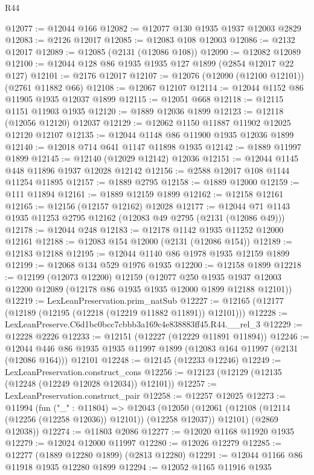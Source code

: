 \begin{lexlean}{R44}
\begin{coremodule}
@12077 := @12044 @166
@12082 := @12077 @130 @1935 @1937 @12003 @2829
@12083 := @2126 @12017
@12085 := @12083 @108 @12003
@12086 := @2132 @12017
@12089 := @12085 (@2131 (@12086 @108))
@12090 := @12082 @12089
@12100 := @12044 @128 @86 @1935 @1935 @127 @1899 (@2854 @12017 @22 @127)
@12101 := @2176 @12017
@12107 := @12076 (@12090 (@12100 @12101)) (@2761 @11882 @66)
@12108 := @12067 @12107
@12114 := @12044 @1152 @86 @11905 @1935 @12037 @1899
@12115 := @12051 @668
@12118 := @12115 @1151 @11903 @1935
@12120 := @1889 @12036 @1899
@12123 := @12118 (@12056 @12120) @12037
@12129 := @12062 @1150 @11887 @11902 @12025 @12120 @12107
@12135 := @12044 @1148 @86 @11900 @1935 @12036 @1899
@12140 := @12018 @714 @641 @1147 @11898 @1935
@12142 := @1889 @11997 @1899
@12145 := @12140 (@12029 @12142) @12036
@12151 := @12044 @1145 @448 @11896 @1937 @12028 @12142
@12156 := @2588 @12017 @108 @1144 @11254 @11895
@12157 := @1889 @2795
@12158 := @1889 @12000
@12159 := @111 @11894
@12161 := @1889 @12159 @1899
@12162 := @12158 @12161
@12165 := @12156 (@12157 @12162) @12028
@12177 := @12044 @71 @1143 @1935 @11253 @2795 @12162 (@12083 @49 @2795 (@2131 (@12086 @49)))
@12178 := @12044 @248
@12183 := @12178 @1142 @1935 @11252 @12000 @12161
@12188 := @12083 @154 @12000 (@2131 (@12086 @154))
@12189 := @12183 @12188
@12195 := @12044 @1140 @86 @1978 @1935 @12159 @1899
@12199 := @12068 @134 @529 @1976 @1935
@12200 := @12158 @1899
@12218 := @12199
    (@12073 @12200)
    @12159
    (@12077
      @250
      @1935
      @1937
      @12003
      @12200
      @12089
      (@12178 @86 @1935 @1935 @12000 @1899 @12188 @12101))
@12219 := LexLeanPreservation.prim_natSub
@12227 := @12165 (@12177 (@12189 (@12195 (@12218 (@12219 @11882 @11891)) @12101)))
@12228 := LexLeanPreserve.C6d1bc0bcc7cbbb3a169c4e838883ff45.R44.__rel_3
@12229 := @12228 @2226
@12233 := @12151 (@12227 (@12229 @11891 @11894))
@12246 := @12044 @446 @86 @1935 @1935 @11997 @1899 (@12083 @164 @11997 (@2131 (@12086 @164))) @12101
@12248 := @12145 (@12233 @12246)
@12249 := LexLeanPreservation.construct_cons
@12256 := @12123 (@12129 (@12135 (@12248 (@12249 @12028 @12034)) @12101))
@12257 := LexLeanPreservation.construct_pair
@12258 := @12257 @12025
@12273 := @11994
    (fun ("_" : @11804) =>
    @12043
      (@12050 (@12061 (@12108 (@12114 (@12256 (@12258 @12036)) @12101)) (@12258 @12037)) @12101)
      (@2869 @12038))
@12274 := @11803 @2086
@12277 := @12020 @1168 @11920 @1935
@12279 := @12024 @12000 @11997
@12280 := @12026 @12279
@12285 := @12277 (@1889 @12280 @1899) (@2813 @12280)
@12291 := @12044 @1166 @86 @11918 @1935 @12280 @1899
@12294 := @12052 @1165 @11916 @1935

\end{coremodule}
\end{lexlean}
